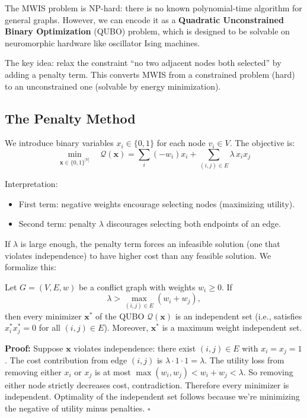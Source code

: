 \label{sec:qubo-formulation}

The MWIS problem is NP-hard: there is no known polynomial-time algorithm for general graphs. However, we can encode it as a \textbf{Quadratic Unconstrained Binary Optimization} (QUBO) problem, which is designed to be solvable on neuromorphic hardware like oscillator Ising machines.

The key idea: relax the constraint ``no two adjacent nodes both selected'' by adding a penalty term. This converts MWIS from a constrained problem (hard) to an unconstrained one (solvable by energy minimization).

\subsection{The Penalty Method}

We introduce binary variables $x_i \in \{0, 1\}$ for each node $v_i \in V$. The objective is:
\[
\min_{\mathbf{x} \in \{0,1\}^{|V|}} \quad \mathcal{Q}(\mathbf{x}) = \sum_i (-w_i) x_i + \sum_{(i,j) \in E} \lambda \, x_i x_j
\]

Interpretation:
\begin{itemize}
\item First term: negative weights encourage selecting nodes (maximizing utility).
\item Second term: penalty $\lambda$ discourages selecting both endpoints of an edge.
\end{itemize}

If $\lambda$ is large enough, the penalty term forces an infeasible solution (one that violates independence) to have higher cost than any feasible solution. We formalize this:

\begin{theorem}
\label{thm:penalty-bound}
Let $G = (V, E, w)$ be a conflict graph with weights $w_i \geq 0$. If
\[
\lambda > \max_{(i,j) \in E} (w_i + w_j),
\]
then every minimizer $\mathbf{x}^*$ of the QUBO $\mathcal{Q}(\mathbf{x})$ is an independent set (i.e., satisfies $x_i^* x_j^* = 0$ for all $(i,j) \in E$). Moreover, $\mathbf{x}^*$ is a maximum weight independent set.
\end{theorem}

\textbf{Proof:} Suppose $\mathbf{x}$ violates independence: there exist $(i, j) \in E$ with $x_i = x_j = 1$. The cost contribution from edge $(i,j)$ is $\lambda \cdot 1 \cdot 1 = \lambda$. The utility loss from removing either $x_i$ or $x_j$ is at most $\max(w_i, w_j) < w_i + w_j < \lambda$. So removing either node strictly decreases cost, contradiction. Therefore every minimizer is independent. Optimality of the independent set follows because we're minimizing the negative of utility minus penalties. \hfill $\square$

